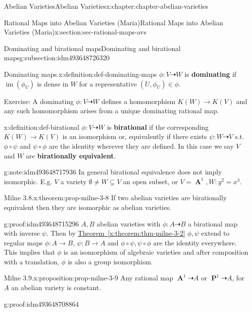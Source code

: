 \documentclass[oneside,10pt,]{book}
\newcommand{\terminology}[1]{\textbf{#1}}
\numberwithin{equation}{section}
\DeclareMathOperator{\im}{im}
\DeclareMathOperator{\aff}{\mathbf{A}}
\DeclareMathOperator{\PP}{\mathbf{P}}
\begin{document}
\begin{chapterptx}{Abelian Varieties}{}{Abelian Varieties}{}{}{x:chapter:chapter-abelian-varieties}
\begin{sectionptx}{Rational Maps into Abelian Varieties (Maria)}{}{Rational Maps into Abelian Varieties (Maria)}{}{}{x:section:sec-rational-maps-avs}
\begin{subsectionptx}{Dominating and birational maps}{}{Dominating and birational maps}{}{}{g:subsection:idm493648726320}
\begin{definition}{Dominating maps.}{x:definition:def-dominating-maps}%
\(\phi\colon V \dashrightarrow W\) is \terminology{dominating} if \(\im (\phi_U)\) is dense in \(W\) for a representative \((U,\phi_U)\in \phi\).%
\end{definition}
Exercise: A dominating \(\phi\colon V\dashrightarrow W\) defines a homomorphism \(K(W) \to K(V)\) and any such homomorphism arises from a unique dominating rational map.%
\begin{definition}{}{x:definition:def-birational}%
\(\phi\colon V \dashrightarrow W\) is \terminology{birational} if the corresponding \(K(W)\to K(V)\) is an isomorphism or, equivalently if there exists \(\psi\colon W\dashrightarrow V \) s.t. \(\phi\circ \psi\) and \(\psi\circ\phi\) are the identity wherever they are defined. In this case we say \(V\) and \(W\) are \terminology{birationally equivalent}.%
\end{definition}
\begin{note}{}{g:note:idm493648717936}%
In general birational equivalence does not imply isomorphic. E.g. \(V\) a variety \(\emptyset \ne W\subsetneq V\) an open subset, or \(V= \aff^1, W \colon y^2 =x^3\).%
\end{note}
\begin{theorem}{Milne 3.8.}{}{x:theorem:prop-milne-3-8}%
If two abelian varieties are birationally equivalent then they are isomorphic as abelian varieties.%
\end{theorem}
\begin{proofptx}{}{g:proof:idm493648715296}
\(A,B\) abelian varieties with \(\phi \colon A\dashrightarrow B\) a birational map with inverse \(\psi\). Then by \hyperref[x:theorem:thm-milne-3-2]{Theorem~\ref{x:theorem:thm-milne-3-2}} \(\phi ,\psi\) extend to regular maps   \(\phi\colon A \to B \), \(\psi\colon B\to A\) and \(\phi\circ\psi,\psi\circ\phi\) are  the identity everywhere. This implies that \(\phi\) is an isomorphism of  algebraic varieties and after composition with a translation, \(\phi\) is also a group isomorphism.%
\end{proofptx}
\begin{proposition}{Milne 3.9.}{}{x:proposition:prop-milne-3-9}%
Any rational map \(\aff^1 \dashrightarrow A\) or \(\PP^1 \dashrightarrow A\), for \(A\) an abelian variety is constant.%
\end{proposition}
\begin{proofptx}{}{g:proof:idm493648708864}

\end{proofptx}
\end{subsectionptx}
\end{sectionptx}
\end{chapterptx}
\end{document}
